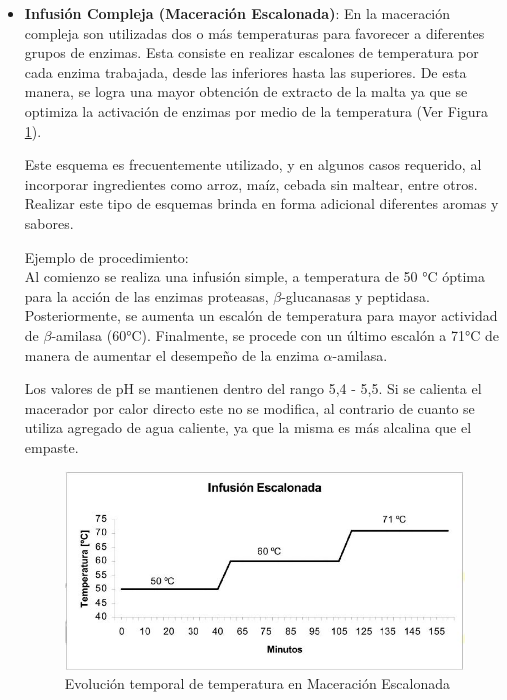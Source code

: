 \begin{itemize}
                    \item \textbf{Infusión Compleja (Maceración Escalonada)}: En la maceración compleja son utilizadas dos o más temperaturas para favorecer a diferentes grupos de enzimas. Esta consiste en realizar escalones de temperatura por cada enzima trabajada, desde las inferiores hasta las superiores. De esta manera, se logra una mayor obtención de extracto de la malta ya que se optimiza la activación de enzimas por medio de la temperatura (Ver Figura \ref{MaceracionEscalonada}).
                    
                    \par Este esquema es frecuentemente utilizado, y en algunos casos requerido, al incorporar ingredientes como arroz, maíz, cebada sin maltear, entre otros. Realizar este tipo de esquemas brinda en forma adicional diferentes aromas y sabores.
                    
                    \par Ejemplo de procedimiento: \\ Al comienzo se realiza una infusión simple, a temperatura de 50 °C óptima para la acción de las enzimas proteasas, $\beta$-glucanasas y peptidasa. Posteriormente, se aumenta un escalón de temperatura para mayor actividad de $\beta$-amilasa (60°C). Finalmente, se procede con un último escalón a 71°C de manera de aumentar el desempeño de la enzima $\alpha$-amilasa.
                    
                    \par Los valores de pH se mantienen dentro del rango 5,4 - 5,5. Si se calienta el macerador por calor directo este no se modifica, al contrario de cuanto se utiliza agregado de agua caliente, ya que la misma es más alcalina que el empaste.
                    
                    \begin{figure} [H]		                                                            \centerline{\includegraphics[scale=0.7]{maceracion_escalonada.jpg}}
                        \caption{Evolución temporal de temperatura en Maceración Escalonada}
                        \label{MaceracionEscalonada}
                    \end{figure}
                    
                \end{itemize}
                
